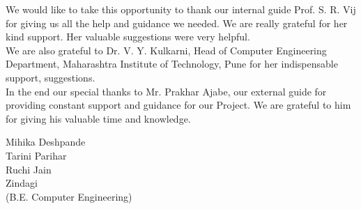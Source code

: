 \documentclass[12pt,a4paper]{report}
\begin{document}
We would like to take this opportunity to thank our internal guide Prof. S. R. Vij
for giving us all the help and guidance we needed. We are really grateful for
her kind support. Her valuable suggestions were very helpful.\\

We are also grateful to Dr. V. Y. Kulkarni, Head of Computer Engineering Department, Maharashtra Institute of Technology, Pune for her indispensable support, suggestions.\\

In the end our special thanks to Mr. Prakhar Ajabe, our external guide for providing constant support and guidance  for our Project. We are grateful to him for giving his valuable time and knowledge.


\begin{flushleft}
\hspace{3.7in}Mihika Deshpande\\
\hspace{3.7in}Tarini Parihar\\
\hspace{3.7in}Ruchi Jain\\
\hspace{3.7in}Zindagi\\
\hspace{3.7in}(B.E. Computer Engineering)\\
\end{flushleft}



\newpage

\tableofcontents

\newpage
{\setlength{\baselineskip}{1.5\baselineskip}
\listoffigures
}
\newpage
{\setlength{\baselineskip}{1.5\baselineskip}
\listoftables
}




\end{document}
